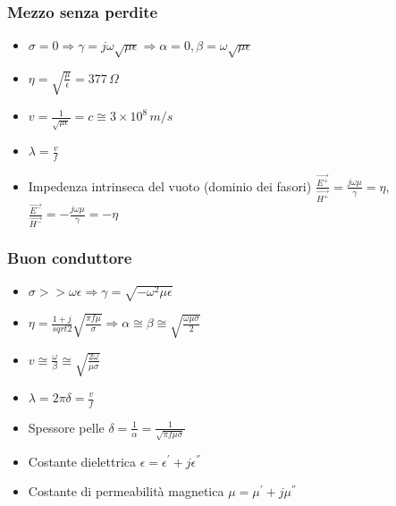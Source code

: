\documentclass{article}
\begin{document}
\subsubsection{Mezzo senza perdite}
\begin{itemize}
	\item \( \sigma = 0 \Rightarrow \gamma = j \omega \sqrt{\mu \epsilon} \Rightarrow \alpha = 0, \beta = \omega \sqrt{\mu \epsilon} \) 
	\item \( \eta = \sqrt{\frac{\mu}{\epsilon}}  = 377 \, \Omega \)
	\item \( v = \frac{1}{\sqrt{\mu \epsilon}} = c \cong 3\times10^8 \, m/s \)
	\item \( \lambda = \frac{v}{f} \)
	\item Impedenza intrinseca del vuoto (dominio dei fasori) \( \frac{\vec{E^+}}{\vec{H^+}} = \frac{j \omega \mu}{\gamma} = \eta \), \(\frac{\vec{E^-}}{\vec{H^-}} = - \frac{j \omega \mu}{\gamma} = - \eta\) 
\end{itemize}

\subsubsection{Buon conduttore}
\begin{itemize}
	\item \( \sigma >> \omega \epsilon \Rightarrow \gamma = \sqrt{-\omega^2 \mu \epsilon} \)
	\item \( \eta = \frac{1+j}{sqrt{2}} \sqrt{\frac{\pi f \mu}{\sigma}} \Rightarrow \alpha \cong \beta
	\cong \sqrt{\frac{\omega \mu \sigma}{2}} \)
	\item \( v \cong \frac{\omega}{\beta} \cong \sqrt{\frac{2 \omega}{\mu \sigma}} \)
	\item \( \lambda = 2 \pi \delta = \frac{v}{f} \)
	\item Spessore pelle \( \delta = \frac{1}{\alpha} = \frac{1}{\sqrt{\pi f \mu \sigma}} \)
	\item Costante dielettrica \( \epsilon = \epsilon ^ { ' } + j \epsilon ^ { '' } \)
	\item Costante di permeabilità magnetica \( \mu = \mu ^ { ' } + j \mu ^ { '' } \)
\end{itemize}
\end{document}
